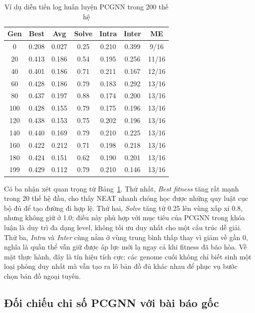 \begin{table}[H]
    \centering
    \small
    \caption{Ví dụ diễn tiến log huấn luyện PCGNN trong 200 thế hệ}
    \label{tab:pcgnn_training_progress}
    \begin{tabular}{c c c c c c c}
        \toprule
        \textbf{Gen} & \textbf{Best} & \textbf{Avg} & \textbf{Solve} & \textbf{Intra} & \textbf{Inter} & \textbf{ME} \\
        \midrule
        0 & 0.208 & 0.027 & 0.25 & 0.210 & 0.399 & 9/16 \\
        20 & 0.413 & 0.186 & 0.54 & 0.195 & 0.256 & 11/16 \\
        40 & 0.401 & 0.186 & 0.71 & 0.211 & 0.167 & 12/16 \\
        60 & 0.428 & 0.186 & 0.79 & 0.183 & 0.292 & 13/16 \\
        80 & 0.437 & 0.197 & 0.88 & 0.174 & 0.200 & 13/16 \\
        100 & 0.428 & 0.155 & 0.79 & 0.175 & 0.196 & 13/16 \\
        120 & 0.438 & 0.153 & 0.75 & 0.202 & 0.196 & 13/16 \\
        140 & 0.440 & 0.169 & 0.79 & 0.210 & 0.225 & 13/16 \\
        160 & 0.422 & 0.212 & 0.71 & 0.198 & 0.218 & 13/16 \\
        180 & 0.424 & 0.151 & 0.62 & 0.190 & 0.201 & 13/16 \\
        199 & 0.429 & 0.112 & 0.79 & 0.210 & 0.146 & 13/16 \\
        \bottomrule
    \end{tabular}
\end{table}

Có ba nhận xét quan trọng từ Bảng~\ref{tab:pcgnn_training_progress}. Thứ nhất, \textit{Best fitness} tăng rất mạnh trong 20 thế hệ đầu, cho thấy NEAT nhanh chóng học được những quy luật cục bộ đủ để tạo đường đi hợp lệ. Thứ hai, \textit{Solve} tăng từ 0.25 lên vùng xấp xỉ 0.8, nhưng không giữ ở 1.0; điều này phù hợp với mục tiêu của PCGNN trong khóa luận là duy trì đa dạng level, không tối ưu duy nhất cho một cấu trúc dễ giải. Thứ ba, \textit{Intra} và \textit{Inter} cùng nằm ở vùng trung bình thấp thay vì giảm về gần 0, nghĩa là quần thể vẫn giữ được áp lực mới lạ ngay cả khi fitness đã bão hòa. Về mặt thực hành, đây là tín hiệu tích cực: các genome cuối không chỉ biết sinh một loại phòng duy nhất mà vẫn tạo ra lô bản đồ đủ khác nhau để phục vụ bước chọn bản đồ ngoại tuyến.

\subsection{Đối chiếu chỉ số PCGNN với bài báo gốc}

